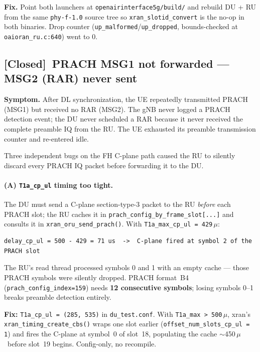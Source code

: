 \documentclass[11pt,a4paper]{article}
\newcommand{\closed}{\textcolor{closedcol}{\textbf{[Closed]}}}
\newcommand{\us}{\ensuremath{\mu}\text{s}}
\begin{document}
\textbf{Fix.}
Point both launchers at \texttt{openairinterface5g/build/} and rebuild DU + RU from the same
\texttt{phy-f-1.0} source tree so \texttt{xran_slotid_convert} is the no-op in both
binaries. Drop counter (\texttt{up_malformed}/\texttt{up_dropped}, bounds-checked at
\texttt{oaioran_ru.c:640}) went to 0.

\subsection{\texorpdfstring{\closed}{[Closed]}\ PRACH MSG1 not forwarded --- MSG2 (RAR) never sent}
\label{sec:prach}

\textbf{Symptom.}
After DL synchronization, the UE repeatedly transmitted PRACH (MSG1) but received no RAR
(MSG2). The gNB never logged a PRACH detection event; the DU never scheduled a RAR because
it never received the complete preamble IQ from the RU. The UE exhausted its preamble
transmission counter and re-entered idle.

Three independent bugs on the FH C-plane path caused the RU to silently discard every PRACH
IQ packet before forwarding it to the DU.

\paragraph{(A) \texttt{T1a\_cp\_ul} timing too tight.}
The DU must send a C-plane section-type-3 packet to the RU \emph{before} each PRACH slot; the
RU caches it in \texttt{prach_config_by_frame_slot[...]} and consults it in
\texttt{xran_oru_send_prach()}. With \texttt{T1a_max_cp_ul = 429}\,\us:
\begin{lstlisting}
delay_cp_ul = 500 - 429 = 71 us  ->  C-plane fired at symbol 2 of the PRACH slot
\end{lstlisting}
The RU's read thread processed symbols 0 and 1 with an empty cache --- those PRACH symbols
were silently dropped. PRACH format~B4 (\texttt{prach_config_index=159}) needs \textbf{12
consecutive symbols}; losing symbols 0--1 breaks preamble detection entirely.

\textbf{Fix:} \texttt{T1a_cp_ul = (285, 535)} in \texttt{du_test.conf}. With
\texttt{T1a\_max > 500}\,\us, xran's \texttt{xran_timing_create_cbs()} wraps one slot
earlier (\texttt{offset_num_slots_cp_ul = 1}) and fires the C-plane at symbol~0 of slot~18,
populating the cache $\sim$450\,\us\ before slot~19 begins. Config-only, no recompile.
\end{document}
